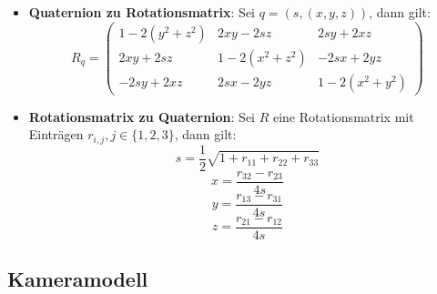 \begin{itemize}
\begin{itemize}
	\end{itemize}
	\item \textbf{Quaternion zu Rotationsmatrix}: Sei $q = (s, (x, y, z))$, dann gilt:
	$$R_q = \begin{pmatrix}
		1 - 2(y^2 + z^2) & 2xy - 2sz & 2sy + 2xz\\
		2xy + 2sz & 1 - 2(x^2 + z^2) & -2sx + 2yz\\
		-2sy + 2xz & 2sx - 2yz & 1 - 2(x^2 + y^2)
	\end{pmatrix}$$
	\item \textbf{Rotationsmatrix zu Quaternion}: Sei $R$ eine Rotationsmatrix mit Einträgen $r_{i,j}, j \in \{1, 2, 3\}$, dann gilt:
	$$s = \frac{1}{2}\sqrt{1 + r_{11} + r_{22} + r_{33}}$$
	$$x = \frac{r_{32} - r_{23}}{4s}$$
	$$y = \frac{r_{13} - r_{31}}{4s}$$
	$$z = \frac{r_{21} - r_{12}}{4s}$$
\end{itemize}
\newpage
\subsection{Kameramodell}%
\label{gtrans:sub:kameramodell}


